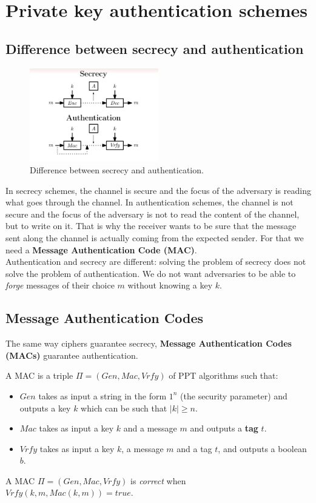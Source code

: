 \documentclass[../main]{subfiles}
\begin{document}
\chapter{Private key authentication schemes}

\section{Difference between secrecy and authentication}

\begin{figure}[h]
    \centering
    \includegraphics[width=0.5\textwidth]{images/difference_secrecy_authentication}
    \caption{Difference between secrecy and authentication.}
\end{figure}

In secrecy schemes, the channel is secure and the focus of the adversary is reading what goes through the channel. 
In authentication schemes, the channel is not secure and the focus of the adversary is not to read the content of the channel, but to write on it.
That is why the receiver wants to be sure that the message sent along the channel is actually coming from the expected sender.
For that we need a \textbf{Message Authentication Code (MAC)}.\\
\noindent
Authentication and secrecy are different: solving the problem of secrecy does not solve the problem of authentication.
We do not want adversaries to be able to \textit{forge} messages of their choice $m$ without knowing a key $k$.

\section{Message Authentication Codes}
The same way ciphers guarantee secrecy, \textbf{Message Authentication Codes (MACs)} guarantee authentication.
\begin{definition}
    A MAC is a triple $\Pi = (Gen, Mac, Vrfy)$ of PPT algorithms such that:
    \begin{itemize}
        \item $Gen$ takes as input a string in the form $1^n$ (the security parameter) and outputs a key $k$ which can be such that $|k|\ge n$.
        \item $Mac$ takes as input a key $k$ and a message $m$ and outputs a \textbf{tag} $t$.
        \item $Vrfy$ takes as input a key $k$, a message $m$ and a tag $t$, and outputs a boolean $b$.
    \end{itemize}
    A MAC $\Pi = (Gen, Mac, Vrfy)$ is \textit{correct} when $Vrfy(k, m, Mac(k, m)) = true$.
\end{definition}
\end{document}
